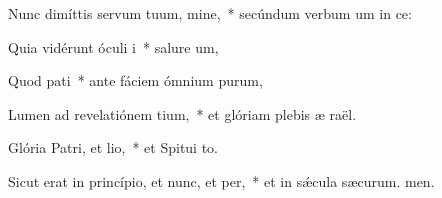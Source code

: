 \item Nunc dimíttis servum tuum, mine,~* secúndum verbum um in ce:
\item Quia vidérunt óculi i~* salure um,
\item Quod pati~* ante fáciem ómnium purum,
\item Lumen ad revelatiónem tium,~* et glóriam plebis æ raël.
\item Glória Patri, et lio,~* et Spitui to.
\item Sicut erat in princípio, et nunc, et per,~* et in sǽcula sæcurum. men.
